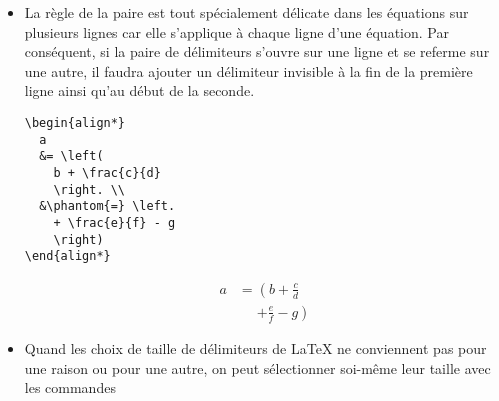 \begin{itemize}
  On notera au passage que l'environnement  de 
  rend plus simple la réalisation de constructions comme celle
  ci-dessus.
  \begin{demo}
    \begin{texample}
\begin{lstlisting}
f(x) =
\begin{cases}
  1 - x, & x < 1 \\
  x - 1, & x \geq 1
\end{cases}
\end{lstlisting}
      \producing
      \begin{equation*}
        f(x) =
        \begin{cases}
          1 - x, & x < 1 \\
          x - 1, & x \geq 1
        \end{cases}
      \end{equation*}
    \end{texample}
  \end{demo}
\item La règle de la paire est tout spécialement délicate dans les
  équations sur plusieurs lignes car elle s'applique à chaque ligne
  d'une équation. Par conséquent, si la paire de délimiteurs s'ouvre
  sur une ligne et se referme sur une autre, il faudra ajouter un
  délimiteur invisible à la fin de la première ligne ainsi qu'au début
  de la seconde.
  \begin{demo}
    \begin{texample}
\begin{lstlisting}
\begin{align*}
  a
  &= \left(
    b + \frac{c}{d}
    \right. \\
  &\phantom{=} \left.
    + \frac{e}{f} - g
    \right)
\end{align*}
\end{lstlisting}
      \producing
      \begin{align*}
        a
        &= \left(
          b + \frac{c}{d}
          \right. \\
        &\phantom{=} \left.
          + \frac{e}{f} - g
          \right)
      \end{align*}
    \end{texample}
  \end{demo}
\item Quand les choix de taille de délimiteurs de {\LaTeX} ne
  conviennent pas pour une raison ou pour une autre, on peut
  sélectionner soi-même leur taille avec les commandes %

\end{itemize}
